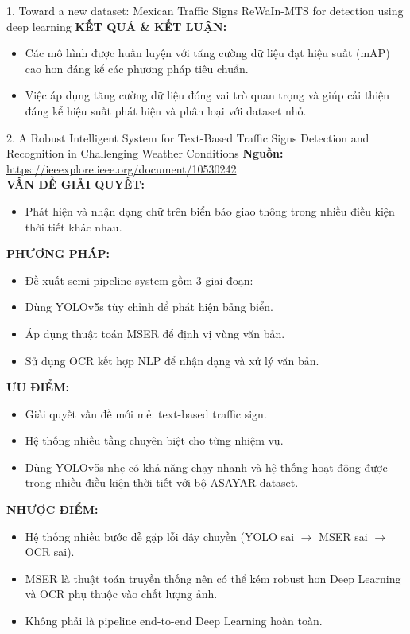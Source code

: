 \documentclass[12pt,a4paper]{article}
\newcommand{\subheading}[1]{\vspace{0.3cm}\noindent\textbf{\textcolor{primary}{\MakeUppercase{#1}:}}\par\vspace{0.1cm}}
\begin{document}
\begin{paperbox}{1. Toward a new dataset: Mexican Traffic Signs ReWaIn-MTS for detection using deep learning}
    \subheading{Kết quả \& Kết luận}
    \begin{itemize}
        \item Các mô hình được huấn luyện với tăng cường dữ liệu đạt hiệu suất (mAP) cao hơn đáng kể các phương pháp tiêu chuẩn.
        \item Việc áp dụng tăng cường dữ liệu đóng vai trò quan trọng và giúp cải thiện đáng kể hiệu suất phát hiện và phân loại với dataset nhỏ.
    \end{itemize}
\end{paperbox}

\vspace{0.5cm}

\begin{paperbox}{2. A Robust Intelligent System for Text-Based Traffic Signs Detection and Recognition in Challenging Weather Conditions}
    \textbf{Nguồn:} \url{https://ieeexplore.ieee.org/document/10530242}\\
    
    \subheading{Vấn đề giải quyết}
    \begin{itemize}
        \item Phát hiện và nhận dạng chữ trên biển báo giao thông trong nhiều điều kiện thời tiết khác nhau.
    \end{itemize}

    \subheading{Phương pháp}
    \begin{itemize}
        \item Đề xuất semi-pipeline system gồm 3 giai đoạn:
        \item Dùng YOLOv5s tùy chỉnh để phát hiện bảng biển.
        \item Áp dụng thuật toán MSER để định vị vùng văn bản.
        \item Sử dụng OCR kết hợp NLP để nhận dạng và xử lý văn bản.
    \end{itemize}

    \subheading{Ưu điểm}
    \begin{itemize}
        \item Giải quyết vấn đề mới mẻ: text-based traffic sign.
        \item Hệ thống nhiều tầng chuyên biệt cho từng nhiệm vụ.
        \item Dùng YOLOv5s nhẹ có khả năng chạy nhanh và hệ thống hoạt động được trong nhiều điều kiện thời tiết với bộ ASAYAR dataset.
    \end{itemize}

    \subheading{Nhược điểm}
    \begin{itemize}
        \item Hệ thống nhiều bước dễ gặp lỗi dây chuyền (YOLO sai $\rightarrow$ MSER sai $\rightarrow$ OCR sai).
        \item MSER là thuật toán truyền thống nên có thể kém robust hơn Deep Learning và OCR phụ thuộc vào chất lượng ảnh.
        \item Không phải là pipeline end-to-end Deep Learning hoàn toàn.
    \end{itemize}


\end{paperbox}
\end{document}
